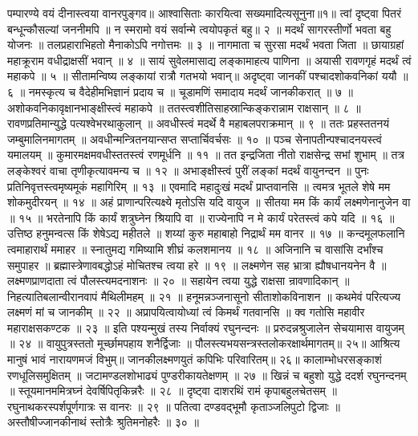पम्पारण्ये वयं दीनास्त्वया वानरपुङ्गव॥
आश्वासिताः कारयित्वा सख्यमादित्यसूनुना॥१॥
त्वां दृष्ट्वा पितरं बन्धून्कौसल्यां जननीमपि ॥
न स्मरामो वयं सर्वान्मे त्वयोपकृतं बहु॥ २ ॥
मदर्थं सागरस्तीर्णो भवता बहु योजनः ॥
तलप्रहाराभिहतो मैनाकोऽपि नगोत्तमः ॥ ३ ॥
नागमाता च सुरसा मदर्थं भवता जिता ॥
छायाग्रहां महाक्रूराम वधीद्राक्षसीं भवान् ॥ ४ ॥
सायं सुवेलमासाद्य लङ्कामाहत्य पाणिना ॥
अयासी रावणगृहं मदर्थं त्वं महाकपे ॥ ५ ॥
सीतामन्विष्य लङ्कायां रात्रौ गतभयो भवान्॥
अदृष्ट्वा जानकीं पश्चादशोकवनिकां ययौ ॥ ६ ॥
नमस्कृत्य च वैदेहीमभिज्ञानं प्रदाय च ॥
चूडामणिं समादाय मदर्थं जानकीकरात् ॥ ७ ॥
अशोकवनिकावृक्षानभाङ्क्षीस्त्वं महाकपे ॥
ततस्त्वशीतिसाहस्रान्किङ्करान्नाम राक्षसान् ॥ ८ ॥
रावणप्रतिमान्युद्धे पत्यश्वेभरथाकुलान् ॥
अवधीस्त्वं मदर्थे वै महाबलपराक्रमान् ॥ ९ ॥
ततः प्रहस्ततनयं जम्बुमालिनमागतम् ॥
अवधीन्मन्त्रितनयान्सप्त सप्तार्चिवर्चसः ॥ १० ॥
पञ्च सेनापतीन्पश्चादनयस्त्वं यमालयम् ॥
कुमारमक्षमवधीस्ततस्त्वं रणमूर्धनि ॥ ११ ॥
तत इन्द्रजिता नीतो राक्षसेन्द्र सभां शुभाम् ॥
तत्र लङ्केश्वरं वाचा तृणीकृत्यावमन्य च ॥ १२ ॥
अभाङ्क्षीस्त्वं पुरीं लङ्कां मदर्थं वायुनन्दन ॥
पुनः प्रतिनिवृत्तस्त्वमृष्यमूकं महागिरिम् ॥ १३ ॥
एवमादि महादुःखं मदर्थं प्राप्तवानसि ॥
त्वमत्र भूतले शेषे मम शोकमुदीरयन् ॥ १४ ॥
अहं प्राणान्परित्यक्ष्ये मृतोऽसि यदि वायुज ॥
सीतया मम किं कार्यं लक्ष्मणेनानुजेन वा ॥ १५ ॥
भरतेनापि किं कार्यं शत्रुघ्नेन श्रियापि वा ॥
राज्येनापि न मे कार्यं परेतस्त्वं कपे यदि ॥ १६ ॥
उत्तिष्ठ हनुमन्वत्स किं शेषेऽद्य महीतले ॥
शय्यां कुरु महाबाहो निद्रार्थं मम वानर ॥ १७ ॥
कन्दमूलफलानि त्वमाहारार्थं ममाहर ॥
स्नातुमद्य गमिष्यामि शीघ्रं कलशमानय ॥ १८ ॥
अजिनानि च वासांसि दर्भांश्च समुपाहर ॥
ब्रह्मास्त्रेणावबद्धोऽहं मोचितश्च त्वया हरे ॥ १९ ॥
लक्ष्मणेन सह भ्रात्रा ह्यौषधानयनेन वै ॥
लक्ष्मणप्राणदाता त्वं पौलस्त्यमदनाशनः ॥ २० ॥
सहायेन त्वया युद्धे राक्षसा न्रावणादिकान् ॥
निहत्यातिबलान्वीरानवापं मैथिलीमहम् ॥ २१ ॥
हनूमन्नञ्जनासूनो सीताशोकविनाशन ॥
कथमेवं परित्यज्य लक्ष्मणं मां च जानकीम् ॥ २२ ॥
अप्रापयित्वायोध्यां त्वं किमर्थं गतवानसि ॥
क्व गतोसि महावीर महाराक्षसकण्टक ॥ २३ ॥
इति पश्यन्मुखं तस्य निर्वाक्यं रघुनन्दनः ॥
प्ररुदन्नश्रुजालेन सेचयामास वायुजम् ॥ २४ ॥
वायुपुत्रस्ततो मूर्च्छामपहाय शनैर्द्विजाः ॥
पौलस्त्यभयसन्त्रस्तलोकरक्षार्थमागतम्॥ २५॥
आश्रित्य मानुषं भावं नारायणमजं विभुम्॥
जानकीलक्ष्मणयुतं कपिभिः परिवारितम्॥ २६॥
कालाम्भोधरसङ्काशं रणधूलिसमुक्षितम् ॥
जटामण्डलशोभाढ्यं पुण्डरीकायतेक्षणम् ॥ २७ ॥
खिन्नं च बहुशो युद्धे ददर्श रघुनन्दनम् ॥
स्तूयमानममित्रघ्नं देवर्षिपितृकिन्नरैः ॥ २८ ॥
दृष्ट्वा दाशरथिं रामं कृपाबहुलचेतसम् ॥
रघुनाथकरस्पर्शपूर्णगात्रः स वानरः ॥ २९ ॥
पतित्वा दण्डवद्भूमौ कृताञ्जलिपुटो द्विजाः ॥
अस्तौषीज्जानकीनाथं स्तोत्रैः श्रुतिमनोहरैः ॥ ३० ॥

